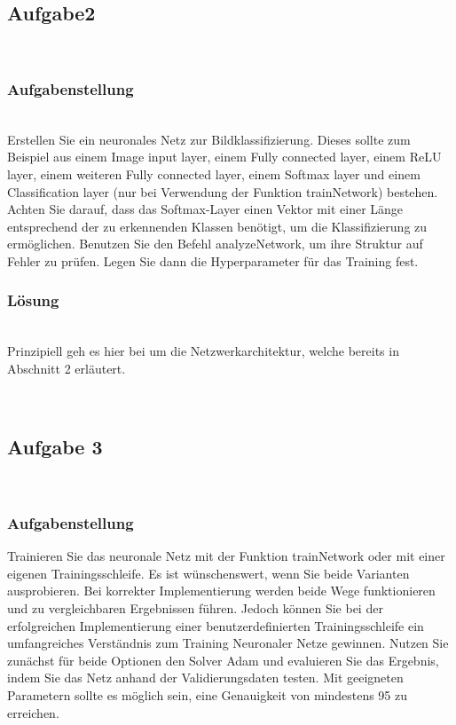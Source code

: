\documentclass[8pt,a4paper]{article}
\begin{document}
\\



\\

\subsection{Aufgabe2}
\\
\subsubsection{Aufgabenstellung}
\\
Erstellen Sie ein neuronales Netz zur Bildklassifizierung. Dieses sollte zum Beispiel aus einem Image input layer, einem Fully connected
layer, einem ReLU layer, einem weiteren Fully connected layer, einem Softmax layer und einem Classification layer (nur bei Verwendung der Funktion trainNetwork) bestehen. Achten Sie darauf, dass
das Softmax-Layer einen Vektor mit einer Länge entsprechend der zu
erkennenden Klassen benötigt, um die Klassifizierung zu ermöglichen.
Benutzen Sie den Befehl analyzeNetwork, um ihre Struktur auf Fehler
zu prüfen. Legen Sie dann die Hyperparameter für das Training fest.
\\
\subsubsection{Lösung}
\\
Prinzipiell geh es hier bei um die Netzwerkarchitektur, welche bereits in Abschnitt 2 erläutert.

\\
\subsection{Aufgabe 3}
\\
\subsubsection{Aufgabenstellung}
Trainieren Sie das neuronale Netz mit der Funktion trainNetwork oder
mit einer eigenen Trainingsschleife. Es ist wünschenswert, wenn Sie
beide Varianten ausprobieren. Bei korrekter Implementierung werden
beide Wege funktionieren und zu vergleichbaren Ergebnissen führen.
Jedoch können Sie bei der erfolgreichen Implementierung einer benutzerdefinierten Trainingsschleife ein umfangreiches Verständnis zum
Training Neuronaler Netze gewinnen. Nutzen Sie zunächst für beide
Optionen den Solver Adam und evaluieren Sie das Ergebnis, indem Sie
das Netz anhand der Validierungsdaten testen. Mit geeigneten Parametern sollte es möglich sein, eine Genauigkeit von mindestens 95 %
zu erreichen.\\
\end{document}
